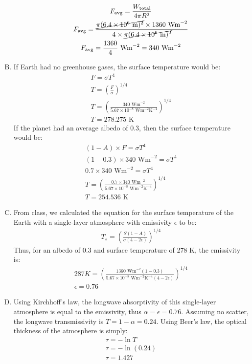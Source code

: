 \documentclass[11pt,a4paper,margin=1in]{article}
\begin{document}
\begin{enumerate}[A.]
    \begin{gather*}
        F_\text{avg} = \frac{W_\text{total}}{4 \pi R^2} \\
        F_\text{avg} = \frac{\cancel{\pi (6.4 \times 10^6 \text { m})^2} \times 1360 
            \text{ Wm}^{-2}}{4 \times \cancel{\pi (6.4 \times 10^6 \text { m})^2}} \\
        F_\text{avg} = \frac{1360}{4} \text{ Wm}^{-2} = 340 \text{ Wm}^{-2}
    \end{gather*}
    \item 
    If Earth had no greenhouse gases, the surface temperature would be:
    \begin{gather*}
        F = \sigma T^4 \\
        T = \left( \frac{F}{\sigma} \right)^{1/4} \\
        T = \left( \frac{340 \text{ Wm}^{-2}}{5.67 \times 10^{-8} \text{ Wm}^{-2} 
            \text{K}^{-4}} \right)^{1/4} \\
        T = 278.275 \text{ K}
    \end{gather*}
    If the planet had an average albedo of 0.3, then the surface temperature would
    be:
    \begin{gather*}
        (1 - A) \times F = \sigma T^4 \\
        (1 - 0.3) \times 340 \text{ Wm}^{-2} = \sigma T^4 \\
        0.7 \times 340 \text{ Wm}^{-2} = \sigma T^4 \\
        T = \left( \frac{0.7 \times 340 \text{ Wm}^{-2}}{5.67 \times 10^{-8} 
            \text{ Wm}^{-2} \text{K}^{-4}} \right)^{1/4} \\
        T = 254.536 \text{ K}
    \end{gather*}
    \item
    From class, we calculated the equation for the surface temperature of the Earth
    with a single-layer atmosphere with emissivity $\epsilon$ to be:
    \begin{gather*}
        T_s = \left( \frac{S(1 - A)}{\sigma(4 - 2\epsilon)} \right)^{1/4}
    \end{gather*}
    Thus, for an albedo of 0.3 and surface temperature of 278 K, the emissivity
    is:
    \begin{gather*}
        287 K = \left( \frac{1360 \text{ Wm}^{-2} (1 - 0.3)}{5.67 \times 10^{-8} 
            \text{ Wm}^{-2}\text{K}^{-4} (4 - 2\epsilon)} \right)^{1/4} \\
        \epsilon = 0.76
    \end{gather*}
    \item 
    Using Kirchhoff's law, the longwave absorptivity of this single-layer atmosphere
    is equal to the emissivity, thus $\alpha = \epsilon = 0.76$. Assuming no scatter,
    the longwave transmissivity is $T = 1 - \alpha = 0.24$. Using Beer's law, the 
    optical thickness of the atmosphere is simply:
    \begin{gather*}
        \tau = -\ln T\\
        \tau = -\ln(0.24) \\
        \tau = 1.427
    \end{gather*}
\end{enumerate}
\end{document}

